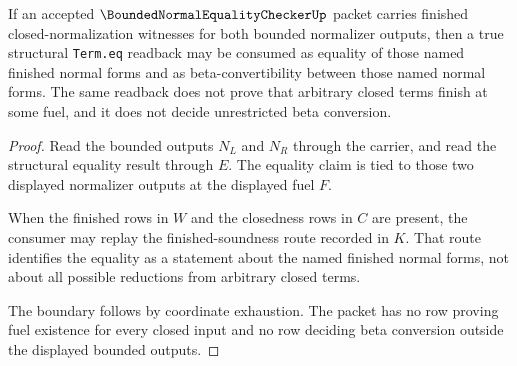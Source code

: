 \begin{theorem}
\label{thm:bounded-normal-equality-checker-finished-soundness-boundary}
If an accepted $\BoundedNormalEqualityCheckerUp$ packet carries finished
closed-normalization witnesses for both bounded normalizer outputs, then a
true structural \texttt{Term.eq} readback may be consumed as equality of those
named finished normal forms and as beta-convertibility between those named
normal forms. The same readback does not prove that arbitrary closed terms
finish at some fuel, and it does not decide unrestricted beta conversion.
\end{theorem}
\begin{proof}
Read the bounded outputs $N_L$ and $N_R$ through the carrier, and read the
structural equality result through $E$. The equality claim is tied to those two
displayed normalizer outputs at the displayed fuel $F$.

When the finished rows in $W$ and the closedness rows in $C$ are present, the
consumer may replay the finished-soundness route recorded in $K$. That route
identifies the equality as a statement about the named finished normal forms,
not about all possible reductions from arbitrary closed terms.

The boundary follows by coordinate exhaustion. The packet has no row proving
fuel existence for every closed input and no row deciding beta conversion
outside the displayed bounded outputs.
\end{proof}

